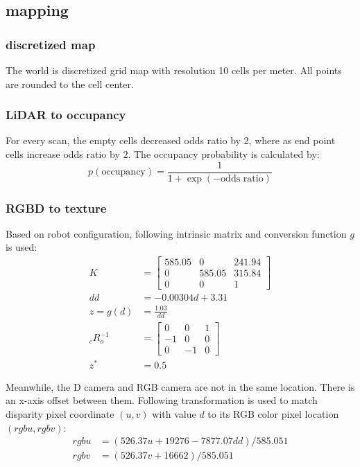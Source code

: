 \documentclass[conference]{IEEEtran}
\begin{document}
\subsection{mapping}
\subsubsection{discretized map}
The world is discretized grid map with resolution 10 cells per meter.
All points are rounded to the cell center.

\subsubsection{LiDAR to occupancy}
For every scan, the empty cells decreased odds ratio by 2, where as end point cells
increase odds ratio by 2. The occupancy probability is calculated by:
$$
p\left(\text{occupancy}\right) = \frac{1}{1 + \exp\left(- \text{odds ratio}\right)}
$$

\subsubsection{RGBD to texture}
Based on robot configuration,
following intrinsic matrix and conversion function $g$ is used:
$$
\begin{aligned}
K&=\left[ \begin{matrix}585.05&0&241.94\\ 0&585.05&315.84\\ 0&0&1\end{matrix} \right] \\ 
dd&=-0.00304d+3.31 \\ 
z = g(d) &= \frac{1.03}{dd} \\
{}_cR_o^{-1} &= \left[ \begin{matrix}0&0&1\\ -1&0&0\\ 0&-1&0\end{matrix} \right] \\
z^* & = 0.5
\end{aligned}
$$

Meanwhile, the D camera and RGB camera are not in the same location. 
There is an x-axis offset between them.
Following transformation is used to match 
disparity pixel coordinate $(u, v)$ with value $d$
to its RGB color pixel location $(rgbu, rgbv)$:
$$
\begin{aligned}
    rgbu&=\left( 526.37u+19276-7877.07dd\right)  /585.051\\ 
    rgbv&=\left( 526.37v+16662\right)  /585.051
\end{aligned} 
$$
\end{document}
